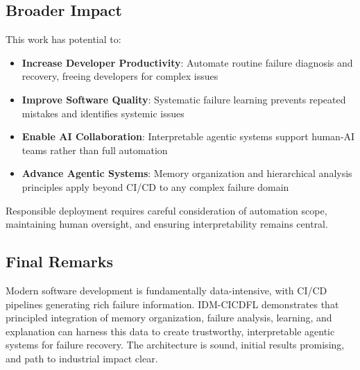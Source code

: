 \documentclass[11pt]{article}
\begin{document}
\subsection{Broader Impact}

This work has potential to:

\begin{itemize}
    \item \textbf{Increase Developer Productivity}: Automate routine failure diagnosis and recovery, freeing developers for complex issues
    
    \item \textbf{Improve Software Quality}: Systematic failure learning prevents repeated mistakes and identifies systemic issues
    
    \item \textbf{Enable AI Collaboration}: Interpretable agentic systems support human-AI teams rather than full automation
    
    \item \textbf{Advance Agentic Systems}: Memory organization and hierarchical analysis principles apply beyond CI/CD to any complex failure domain
\end{itemize}

Responsible deployment requires careful consideration of automation scope, maintaining human oversight, and ensuring interpretability remains central.

\subsection{Final Remarks}

Modern software development is fundamentally data-intensive, with CI/CD pipelines generating rich failure information. IDM-CICDFL demonstrates that principled integration of memory organization, failure analysis, learning, and explanation can harness this data to create trustworthy, interpretable agentic systems for failure recovery. The architecture is sound, initial results promising, and path to industrial impact clear.
\end{document}
